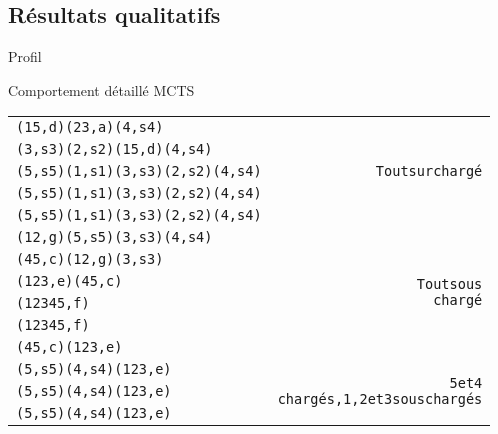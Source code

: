 \documentclass[tikz]{beamer}
\begin{document}
\subsection{Résultats qualitatifs}
\begin{frame}[c]{Profil}
    \begin{figure}
    \end{figure}
\end{frame}
\begin{frame}[c]{Comportement détaillé MCTS}
  \begin{scriptsize}
    \begin{alltt}
      \begin{tabular}{lr}
        (1 5, d) (2 3, a) (4, s4) & \multirow{5}{20mm}{\textsf{Tout surchargé}}\\
        (3, s3) (2, s2) (1 5, d) (4, s4) & \\
        (5, s5) (1, s1) (3, s3) (2, s2) (4, s4) & \\
        (5, s5) (1, s1) (3, s3) (2, s2) (4, s4) & \\
        (5, s5) (1, s1) (3, s3) (2, s2) (4, s4) & \\
        \midrule
        (1 2, g) (5, s5) (3, s3) (4, s4) & \multirow{6}{20mm}{\textsf{Tout sous
        chargé}}\\
        (4 5, c) (1 2, g) (3, s3) & \\
        (1 2 3, e) (4 5, c) & \\
        (1 2 3 4 5, f) & \\
        (1 2 3 4 5, f) & \\
        (4 5, c) (1 2 3, e) & \\
        \midrule
        (5, s5) (4, s4) (1 2 3, e) & \multirow{3}{20mm}{\textsf{5 et 4
        chargés, 1, 2 et 3 sous chargés}}\\
        (5, s5) (4, s4) (1 2 3, e) & \\
        (5, s5) (4, s4) (1 2 3, e) & \\
      \end{tabular}
    \end{alltt}
  \end{scriptsize}
\end{frame}
\end{document}
